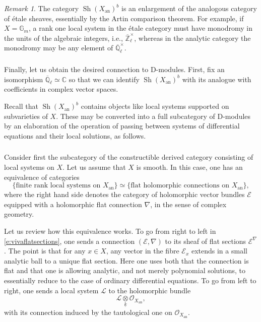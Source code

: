 \documentclass[10pt]{amsart}
\newcommand{\on}{\operatorname}
\theoremstyle{remark}
\newtheorem{re}[subsubsection]{Remark}
\newcommand{\sL}{\mathscr{L}}
\newcommand{\sE}{\mathscr{E}}
\newcommand{\OO}{\mathscr{O}}
\numberwithin{equation}{section}
\newcommand{\ck}{\underline{k}}
\begin{document}
	\begin{re} The category $\on{Sh}(X_{\on{an}})^b$ is an enlargement of the 
	analogous category of \'{e}tale sheaves, essentially by the Artin 
	comparison theorem. For example, if $X = \mathbb{G}_m$, a rank one local 
	system in the \'{e}tale category must have monodromy in the units of the
	algebraic integers, i.e.,  $\overline{\mathbb{Z}}_\ell^{\times}$, whereas in the 
	analytic category  the monodromy may be any element of 
	$\overline{\mathbb{Q}}_\ell^\times$. 
		
	\end{re}
	
	
	
	\subsubsection{} Finally, let us obtain the desired connection to 
	D-modules. First, fix an isomorphism $\overline{\mathbb{Q}}_\ell \simeq 
	\mathbb{C}$ so that we can identify 
	$
	\on{Sh}(X_{\on{an}})^b
	$
	with its analogue with coefficients in complex vector spaces. 
	
	Recall that $\on{Sh}(X_{\on{an}})^b$ contains objects like local systems 
	supported on subvarieties of $X$. These may be converted into a full 
	subcategory of D-modules by an elaboration of the operation of passing 
	between systems of differential equations and their local solutions, as 
	follows. 
	
	
	\subsubsection{} Consider first the subcategory of the constructible 
	derived category consisting of local systems on $X$. Let us assume that $X$ 
	is smooth. In this case, one has an equivalence of categories 
	\begin{equation} \label{e:vivaflatsections}
	\{ \text{finite rank local systems on $X_{\on{an}}$} \} \simeq \{ 
	\text{flat holomorphic connections on $X_{\on{an}}$} \}, 
	\end{equation}
	where the right hand side denotes the category of holomorphic vector 
	bundles $\sE$ equipped with a holomorphic flat connection $\nabla$,  in the 
	sense of complex geometry. 
	
	Let us review how this equivalence works. To go from right to left in \eqref{e:vivaflatsections}, one 
	sends a connection $(\sE, \nabla)$ to its sheaf of flat sections 
	$\sE^{\nabla}$. The point is that for any $x \in X$, any vector 
	in the fibre $\sE_x$ extends in a small analytic ball to a unique flat 
	section. Here one uses both that the connection is flat and that one is 
	allowing analytic, and not merely polynomial solutions, to essentially 
	reduce to the case of ordinary differential equations. To go from left to 
	right, one sends a local system $\sL$ to the holomorphic bundle 
	\[
	\sL \underset{\ck}{\otimes} \OO_{X_{\on{an}}},
	\]
	with its connection induced by the tautological one on $\OO_{X_{\on{an}}}$. 
	
\end{document}
